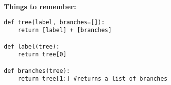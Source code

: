 \textbf{Things to remember:}

\begin{lstlisting}
def tree(label, branches=[]):
    return [label] + [branches]

def label(tree):
    return tree[0] 

def branches(tree):
    return tree[1:] #returns a list of branches
		
\end{lstlisting}

